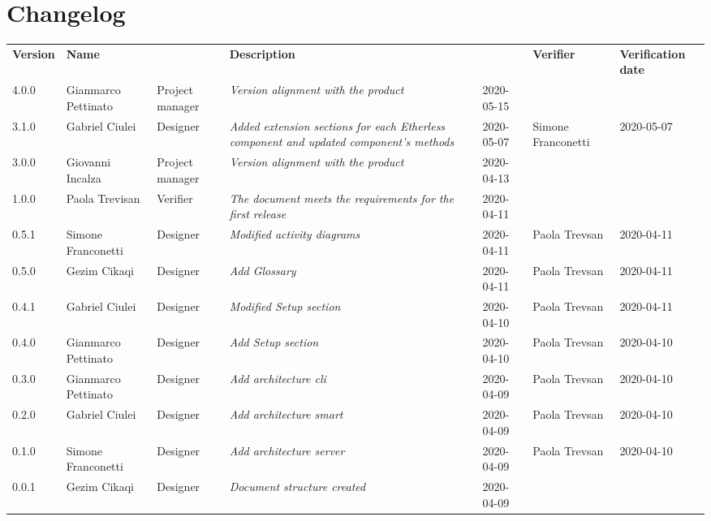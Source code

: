 \section*{Changelog}
\renewcommand{\arraystretch}{1.8}
  \setlength\LTleft{-1.7cm}
  \begin{longtable}{|p{1.7cm}|p{2cm}|p{2.5cm}|p{3cm}|p{1.7cm}|p{2cm}|p{2.3cm}|}
    \hline
    \rowcolor{header}
    \textbf{Version} & \textbf{Name} & \centering{\textbf{Role}} & \textbf{Description} &      \centering{\textbf{Date}} & \textbf{Verifier} & \textbf{Verification date} \\
	4.0.0 & Gianmarco Pettinato & Project manager & \small{\textit{Version alignment with the product}} & 2020-05-15 &  & \\
 	3.1.0 & Gabriel Ciulei & Designer & \small{\textit{Added extension sections for each Etherless component and updated component's methods}} & 2020-05-07 & Simone Franconetti & 2020-05-07\\
    3.0.0 & Giovanni Incalza & Project manager & \small{\textit{Version alignment with the product}} & 2020-04-13 &  & \\

    1.0.0 & Paola Trevisan & Verifier & \small{\textit{The document meets the requirements for the first release}} & 2020-04-11 &  & \\
    0.5.1 & Simone Franconetti & Designer & \small{\textit{Modified activity diagrams}} & 2020-04-11 & Paola Trevsan & 2020-04-11\\
    0.5.0 & Gezim Cikaqi & Designer & \small{\textit{Add Glossary}} & 2020-04-11 &Paola Trevsan  & 2020-04-11\\
    0.4.1 & Gabriel Ciulei & Designer & \small{\textit{Modified Setup section}} & 2020-04-10 &Paola Trevsan  & 2020-04-11\\
    0.4.0 & Gianmarco Pettinato & Designer & \small{\textit{Add Setup section}} & 2020-04-10 & Paola Trevsan & 2020-04-10\\
    0.3.0 & Gianmarco Pettinato & Designer & \small{\textit{Add architecture cli}} & 2020-04-09 &Paola Trevsan  & 2020-04-10\\
    0.2.0 & Gabriel Ciulei & Designer & \small{\textit{Add architecture smart}} & 2020-04-09 & Paola Trevsan & 2020-04-10\\
    0.1.0 & Simone Franconetti & Designer & \small{\textit{Add architecture server}} & 2020-04-09 & Paola Trevsan & 2020-04-10\\
    0.0.1 & Gezim Cikaqi & Designer & \small{\textit{Document structure created}} & 2020-04-09 &  & \\

    \hline
  \end{longtable}
\setlength\LTleft{0cm}
\restoregeometry
